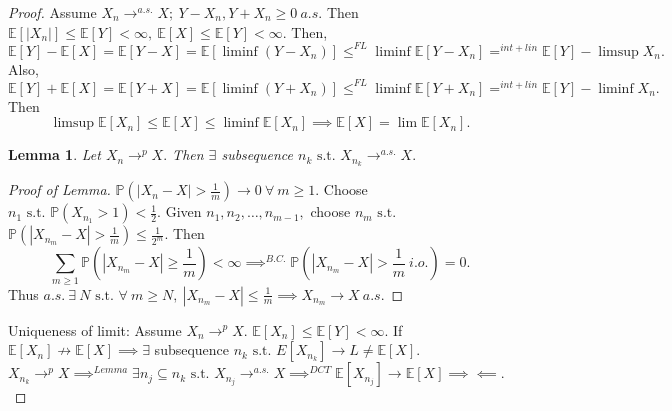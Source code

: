\documentclass{article}
\newcommand{\1}{\mathds{1}}
\newcommand{\E}{\mathbb{E}}
\newcommand{\PB}{\mathbb{P}}
\newcommand{\lf}{\left}
\newcommand{\rg}{\right}
\newcommand{\f}[2]{\frac{#1}{#2}}
\newcommand{\contra}{\implies\impliedby}
\newcommand{\st}{\text{ s.t. }}
\newcommand{\fb}[1]{\lf(#1\rg)}
\newcommand{\card}[1]{\lf\vert #1\rg\vert}
\newtheorem{lemma}[theorem]{Lemma}
\begin{document}
\begin{proof}
    Assume $X_n\to^{a.s.}X;\ Y-X_n,Y+X_n\geq 0\ a.s.$ Then $\E[\card{X_n}]\leq\E[Y]<\infty,\ \E[X]\leq\E[Y]<\infty.$ Then, $$\E[Y]-\E[X]=\E[Y-X]=\E[\liminf(Y-X_n)]\leq^{FL}\liminf\E[Y-X_n]=^{int+lin}\E[Y]-\limsup X_n.$$ Also,
    $$\E[Y]+\E[X]=\E[Y+X]=\E[\liminf(Y+X_n)]\leq^{FL}\liminf\E[Y+X_n]=^{int+lin}\E[Y]-\liminf X_n.$$
    Then $$\limsup \E[X_n]\leq\E[X]\leq\liminf\E[X_n]\implies \E[X]=\lim\E[X_n].$$

\begin{lemma}
    Let $X_n\to^p X.$ Then $\exists$ subsequence $n_k\st X_{n_k}\to^{a.s.} X.$ 
\end{lemma}
\begin{proof}[Proof of Lemma]
    $\PB\fb{\card{X_n-X}>\f 1m}\to 0\ \forall\ m\geq 1.$ Choose $n_1\st \PB(X_{n_1}>1)<\f 12.$ Given $n_1,n_2,\ldots,n_{m-1},$ choose $n_m\st$ $\PB\fb{\card{X_{n_m}-X}>\f 1m}\leq \f 1{2^m}.$ Then $$\sum_{m\geq 1}\PB\fb{\card{X_{n_m}-X}\geq \f 1m}<\infty\implies^{B.C.}\PB\fb{\card{X_{n_m}-X}>\f 1m\ i.o.}=0.$$ Thus $a.s.\ \exists\ N\st\forall\ m\geq N,\ \card{X_{n_m}-X}\leq \f1m\implies X_{n_m}\to X\ a.s.$
\end{proof}
Uniqueness of limit: Assume $X_n\to^p X.$ $\E[X_n]\leq\E[Y]<\infty.$ If $\E[X_n]\not\to\E[X]\implies\exists$ subsequence $n_k\st E[X_{n_k}]\to L\ne\E[X].$ $X_{n_k}\to^p X\implies^{Lemma}\exists n_j\subseteq n_k\st X_{n_j}\to^{a.s.}X\implies^{DCT} \E[X_{n_j}]\to\E[X]\contra.$ 
\end{proof}
\end{document}
